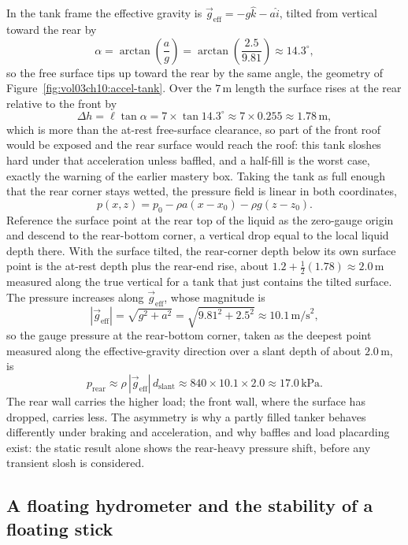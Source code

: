 In the tank frame the effective gravity is $\vec g_{\text{eff}} = -g\hat k
- a\hat i$, tilted from vertical toward the rear by
\[
\alpha = \arctan\!\left(\frac{a}{g}\right)
= \arctan\!\left(\frac{2.5}{9.81}\right)
\approx 14.3^{\circ},
\]
so the free surface tips up toward the rear by the same angle, the geometry
of Figure~\ref{fig:vol03ch10:accel-tank}. Over the $7\,\si{\meter}$ length
the surface rises at the rear relative to the front by
\[
\Delta h = \ell \tan\alpha = 7 \times \tan 14.3^{\circ}
\approx 7 \times 0.255 \approx 1.78\,\si{\meter},
\]
which is more than the at-rest free-surface clearance, so part of the front
roof would be exposed and the rear surface would reach the roof: this tank
sloshes hard under that acceleration unless baffled, and a half-fill is the
worst case, exactly the warning of the earlier mastery box. Taking the
tank as full enough that the rear corner stays wetted, the pressure field
is linear in both coordinates,
\[
p(x, z) = p_0 - \rho a (x - x_0) - \rho g (z - z_0).
\]
Reference the surface point at the rear top of the liquid as the zero-gauge
origin and descend to the rear-bottom corner, a vertical drop equal to the
local liquid depth there. With the surface tilted, the rear-corner depth
below its own surface point is the at-rest depth plus the rear-end rise,
about $1.2 + \tfrac12(1.78) \approx 2.0\,\si{\meter}$ measured along the
true vertical for a tank that just contains the tilted surface. The
pressure increases along $\vec g_{\text{eff}}$, whose magnitude is
\[
|\vec g_{\text{eff}}| = \sqrt{g^2 + a^2}
= \sqrt{9.81^2 + 2.5^2}
\approx 10.1\,\text{m/s}^2,
\]
so the gauge pressure at the rear-bottom corner, taken as the deepest point
measured along the effective-gravity direction over a slant depth of about
$2.0\,\si{\meter}$, is
\[
p_{\text{rear}} \approx \rho\,|\vec g_{\text{eff}}|\, d_{\text{slant}}
\approx 840 \times 10.1 \times 2.0
\approx 17.0\,\text{kPa}.
\]
The rear wall carries the higher load; the front wall, where the surface
has dropped, carries less. The asymmetry is why a partly filled tanker
behaves differently under braking and acceleration, and why baffles and
load placarding exist: the static result alone shows the rear-heavy
pressure shift, before any transient slosh is considered.



\subsection{A floating hydrometer and the stability of a floating stick}

